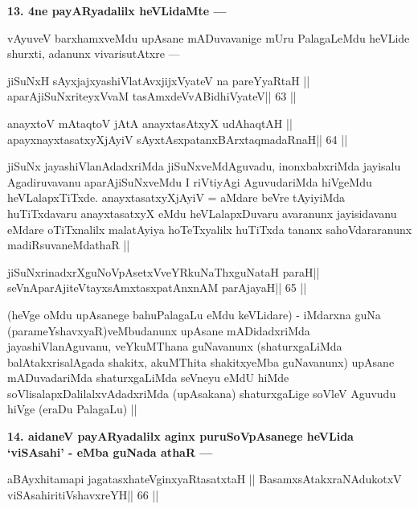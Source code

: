 \begin{artha}
{\bf 13. 4ne payARyadalilx heVLidaMte ---}
\end{artha}

\begin{artha}
vAyuveV barxhamxveMdu upAsane mADuvavanige mUru PalagaLeMdu heVLide shurxti, adanunx vivarisutAtxre ---
\end{artha}

\begin{shl}
jiSuNxH sAyxjajxyashiVlatAvxjijxVyateV na pareYyaRtaH ||
aparAjiSuNxriteyxVvaM tasAmxdeVvABidhiVyateV\hfill || 63 ||
\end{shl}

\begin{shl}
anayxtoV mAtaqtoV jAtA anayxtasAtxyX udAhaqtAH ||
apayxnayxtasatxyXjAyiV sAyxtAsxpatanxBArxtaqmadaRnaH\hfill || 64 ||
\end{shl}

\begin{artha}
jiSuNx jayashiVlanAdadxriMda jiSuNxveMdAguvadu, inonxbabxriMda jayisalu 
Agadiruvavanu aparAjiSuNxveMdu I riVtiyAgi AguvudariMda hiVgeMdu heVLalapxTiTxde. anayxtasatxyXjAyiV = aMdare beVre tAyiyiMda huTiTxdavaru anayxtasatxyX eMdu heVLalapxDuvaru avaranunx jayisidavanu eMdare oTiTxnalilx malatAyiya hoTeTxyalilx huTiTxda tananx sahoVdararanunx madiRsuvaneMdathaR ||
\end{artha}

\begin{shl}
jiSuNxrinadxrXguNoVpAsetxVveYRkuNaThxguNataH paraH||
seVnA\s parAjiteVtayxsAmxtasxpatAnxnAM parAjayaH\hfill || 65 ||
\end{shl}

\begin{artha}
(heVge oMdu upAsanege bahuPalagaLu eMdu keVLidare) - iMdarxna guNa (parameYshavxyaR)veMbudanunx upAsane mADidadxriMda jayashiVlanAguvanu, veYkuMThana guNavanunx (shaturxgaLiMda balAtakxrisalAgada shakitx, akuMThita shakitxyeMba guNavanunx) upAsane mADuvadariMda shaturxgaLiMda seVneyu eMdU hiMde soVlisalapxDalilalxvAdadxriMda (upAsakana) shaturxgaLige soVleV Aguvudu hiVge (eraDu PalagaLu) ||
\end{artha}

\begin{artha}
{\bf 14. aidaneV payARyadalilx aginx puruSoVpAsanege heVLida `viSAsahi' - eMba guNada athaR ---}
\end{artha}

\begin{shl}
aBAyxhitamapi jagatasxhateV\s ginxyaRtasatxtaH ||
BasamxsAtakxraNAdukotxV viSAsahiritiVshavxreYH\hfill || 66 ||
\end{shl}

